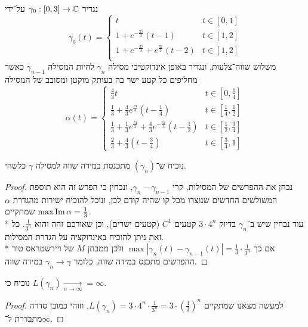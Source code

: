 \question{}
נגדיר $\gamma_0 : [0, 3] \to \mathbb{C}$ על־ידי
\[
	\gamma_0(t) = \begin{cases}
		t & t \in [0, 1] \\
		1 + e^{-\frac{\pi i}{3}} (t - 1) & t \in [1, 2] \\
		1 + e^{-\frac{\pi i}{3}} + e^{\frac{\pi i}{3}} (t - 2) & t \in [1, 2] \\
	\end{cases}
\]
משלוש שווה־צלעות, ונגדיר באופן אינדוקטיבי מסילה $\gamma_n$ להיות המסילה $\gamma_{n - 1}$ כאשר מחליפים כל קטע ישר בה בעותק מוקטן ומסובב של המסילה
\[
	\alpha(t) = \begin{cases}
		\frac{4}{3} t & t \in [0, \frac{1}{4}] \\
		\frac{1}{3} + \frac{4}{3} e^{\frac{\pi i}{3}} (t - \frac{1}{4}) & t \in [\frac{1}{4}, \frac{1}{2}] \\
		\frac{1}{3} + \frac{1}{3} e^{\frac{\pi i}{3}} + \frac{4}{3} e^{-\frac{\pi i}{3}} (t - \frac{1}{2}) & t \in [\frac{1}{2}, \frac{3}{4}] \\
		\frac{2}{3} + \frac{4}{3} (t - \frac{3}{4}) & t \in [\frac{3}{4}, 1]
	\end{cases}
\]

\subquestion{}
נוכיח ש־$(\gamma_n)$ מתכנסת במידה שווה למסילה $\gamma$ כלשהי.
\begin{proof}
	נבחן את ההפרשים של המסילות, קרי $\gamma_n - \gamma_{n - 1}$, ונבחין כי הפרש זה הוא תוספת המשולשים החדשים שנוצרו מכל קו שהיה קודם לכן,
	ונוכל להוכיח ישירות מהגדרת $\alpha$ שמתקיים $\max \operatorname{Im} \alpha = \frac{1}{3}$. \\*
	עוד נבחין שיש ב־$\gamma_n$ בדיוק $3 \cdot 4^n$ קטעים $C^1$ (קטעים ישרים), וכן שאורכם זהה והוא $\frac{1}{3^n}$. כל זאת ניתן להוכיח באינדוקציה על הגדרת המסילות. \\*
	אם כך $\max |\gamma_n(t) - \gamma_{n - 1}(t)| = \frac{1}{3} \cdot \frac{1}{3^n}$ ולכן ממבחן $M$ של ויירשטראס טור ההפרשים מתכנס במידה שווה, כלומר $\gamma_n \to \gamma$ במידה שווה.
\end{proof}

\subquestion{}
נוכיח כי $L(\gamma_n) \xrightarrow[n \to \infty]{} = \infty$.
\begin{proof}
	למעשה מצאנו שמתקיים $L(\gamma_n) = 3 \cdot 4^n \cdot \frac{1}{3^n} = 3 \cdot {\left(\frac{4}{3}\right)}^n$, וזוהי כמובן סדרה מתבדרת ל־$\infty$.
\end{proof}

